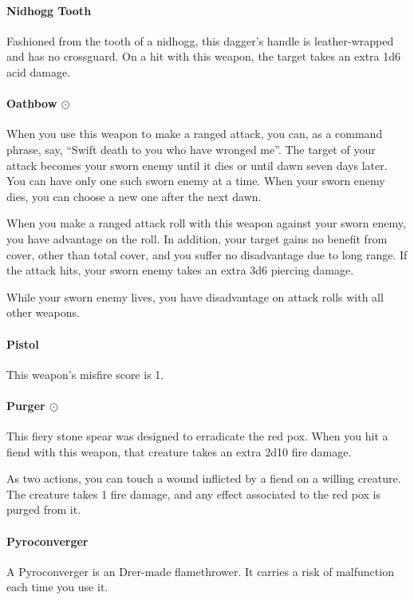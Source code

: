     \paragraph{Nidhogg Tooth}
        Fashioned from the tooth of a nidhogg, this dagger's handle is leather-wrapped and has no crossguard.
        On a hit with this weapon, the target takes an extra 1d6 acid damage.
    \paragraph{Oathbow $\odot$}
        When you use this weapon to make a ranged attack, you can, as a command phrase, say, ``Swift death to you who have wronged me''.
        The target of your attack becomes your sworn enemy until it dies or until dawn seven days later.
        You can have only one such sworn enemy at a time.
        When your sworn enemy dies, you can choose a new one after the next dawn.

        When you make a ranged attack roll with this weapon against your sworn enemy, you have advantage on the roll.
        In addition, your target gains no benefit from cover, other than total cover, and you suffer no disadvantage due to long range.
        If the attack hits, your sworn enemy takes an extra 3d6 piercing damage.

        While your sworn enemy lives, you have disadvantage on attack rolls with all other weapons.
    \paragraph{Pistol}
        This weapon's misfire score is 1.
    \paragraph{Purger $\odot$}
        This fiery stone spear was designed to erradicate the red pox.
        When you hit a fiend with this weapon, that creature takes an extra 2d10 fire damage.

        As two actions, you can touch a wound inflicted by a fiend on a willing creature.
        The creature takes 1 fire damage, and any effect associated to the red pox is purged from it.
    \paragraph{Pyroconverger}
        A Pyroconverger is an Drer-made flamethrower.
        It carries a risk of malfunction each time you use it.

